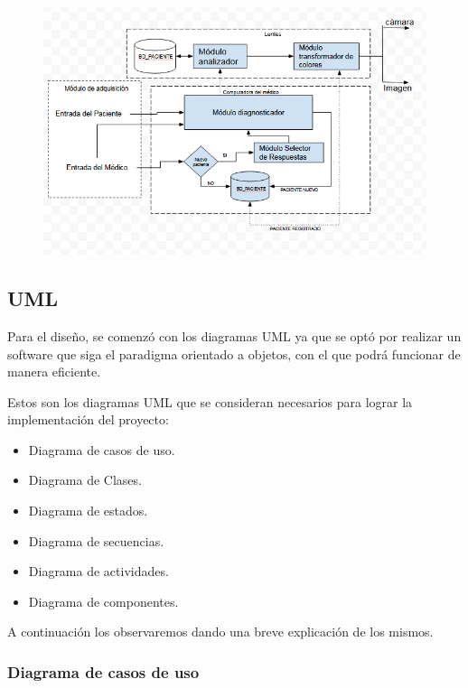 \documentclass[10pt]{article}
\begin{document}
\begin{figure}[H]
	\begin{center}
\includegraphics[scale = 0.75]{Imagenes/BOSQUEJO.PNG}
	\end{center} 
\end{figure}


\subsection{UML}
Para el diseño, se comenzó con los diagramas UML ya que se optó por realizar un software que siga el paradigma orientado a objetos, con el que podrá funcionar de manera eficiente.

Estos son los diagramas UML que se consideran necesarios para lograr la implementación del proyecto:

\begin{itemize}
    \item Diagrama de casos de uso.
    \item Diagrama de Clases.
    \item Diagrama de estados.
    \item Diagrama de secuencias.
    \item Diagrama de actividades. 
    \item Diagrama de componentes.
\end{itemize}

A continuación los observaremos dando una breve explicación de los mismos.

\newpage

\subsubsection{Diagrama de casos de uso}
\end{document}
